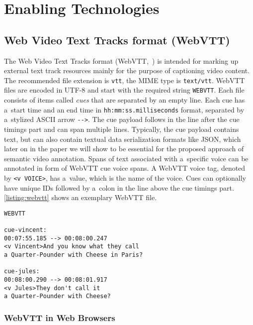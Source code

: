 \documentclass{sig-alternate}
\begin{document}
\cite{vandeursen2012mediafragmentannotations}

\section{Enabling Technologies}

\subsection{Web Video Text Tracks format (WebVTT)}

The Web Video Text Tracks format (WebVTT,~\cite{pfeiffer2013webvtt})
is intended for marking up external text track resources mainly
for the purpose of captioning video content.
The recommended file extension is \texttt{vtt},
the MIME type is \texttt{text/vtt}.
WebVTT files are encoded in UTF-8 and
start with the required string \texttt{WEBVTT}.
Each file consists of items called \emph{cues}
that are separated by an empty line.
Each cue has a~start time and an end time in
\texttt{hh:mm:ss.milliseconds} format,
separated by a~stylized ASCII arrow \texttt{-}\texttt{->}.
The cue payload follows in the line after the cue timings part
and can span multiple lines.
Typically, the cue payload contains text,
but can also contain textual data serialization formats like JSON,
which later on in the paper we will show to be essential
for the proposed approach of semantic video annotation.
Spans of text associated with a~specific voice can be annotated
in form of WebVTT cue voice spans.
A WebVTT voice tag, denoted by \texttt{<v VOICE>}, has a~value,
which is the name of the voice.
Cues can optionally have unique IDs
followed by a~colon in the line
above the cue timings part.
\autoref{listing:webvtt} shows an exemplary WebVTT file.

\begin{lstlisting}[caption={Sample WebVTT file with two cues
    with the IDs \texttt{cue-vincent} and
    \texttt{cue-jules} respectively},
  label=listing:webvtt, float=h!]
WEBVTT

cue-vincent:
00:07:55.185 --> 00:08:00.247
<v Vincent>And you know what they call
a Quarter-Pounder with Cheese in Paris?

cue-jules:
00:08:00.290 --> 00:08:01.917
<v Jules>They don't call it
a Quarter-Pounder with Cheese?
\end{lstlisting}

\subsubsection{WebVTT in Web Browsers}
\end{document}
